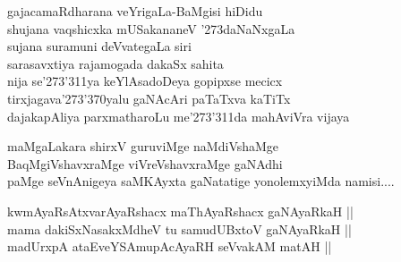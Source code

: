 \begin{entry}
\smallskip
\begin{shl}
gajacamaRdharana veYrigaLa-BaMgisi hiDidu\\
shujana vaqshicxka mUSakananeV \char'273daNaNxgaLa\\
sujana suramuni deVvategaLa siri\\
sarasavxtiya rajamogada dakaSx sahita\\
nija se\char'273\char'311ya keYlAsadoDeya gopipxse mecicx\\ 
tirxjagava\char'273\char'370yalu gaNAcAri paTaTxva kaTiTx\\
dajakapAliya parxmatharoLu me\char'273\char'311da mahAviVra vijaya\\
\end{shl}
\smallskip
{}
\smallskip
{}
\end{entry}

\begin{entry}
\medskip

\begin{shl}
maMgaLakara shirxV guruviMge naMdiVshaMge\\
BaqMgiVshavxraMge viVreVshavxraMge gaNAdhi\\
paMge seVnAnigeya saMKAyxta gaNatatige yonolemxyiMda namisi....
\end{shl}
\smallskip
{}
\end{entry}

\begin{entry}
\medskip
\begin{shl}
kwmAyaRsAtxvarAyaRshacx maThAyaRshacx gaNAyaRkaH ||\\
mama dakiSxNasakxMdheV tu samudUBxtoV gaNAyaRkaH ||\\
madUrxpA ataEveYSAmupAcAyaRH seVvakAM matAH ||
\end{shl}
\medskip
{}
\end{entry}

